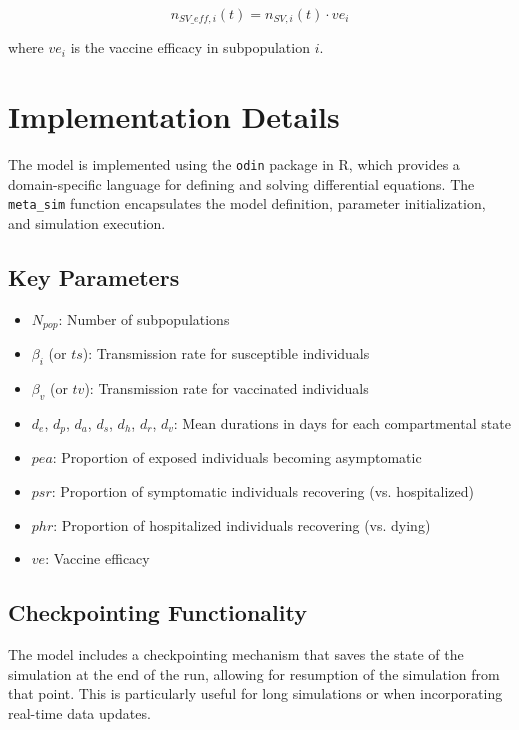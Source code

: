 \documentclass{article}
\begin{document}
\begin{equation}
n_{SV\_eff,i}(t) = n_{SV,i}(t) \cdot ve_i
\end{equation}

where $ve_i$ is the vaccine efficacy in subpopulation $i$.

\section{Implementation Details}

The model is implemented using the \texttt{odin} package in R, which provides a domain-specific language for defining and solving differential equations. The \texttt{meta\_sim} function encapsulates the model definition, parameter initialization, and simulation execution.

\subsection{Key Parameters}

\begin{itemize}
    \item $N_{pop}$: Number of subpopulations
    \item $\beta_i$ (or $ts$): Transmission rate for susceptible individuals
    \item $\beta_v$ (or $tv$): Transmission rate for vaccinated individuals
    \item $d_e$, $d_p$, $d_a$, $d_s$, $d_h$, $d_r$, $d_v$: Mean durations in days for each compartmental state
    \item $pea$: Proportion of exposed individuals becoming asymptomatic
    \item $psr$: Proportion of symptomatic individuals recovering (vs. hospitalized)
    \item $phr$: Proportion of hospitalized individuals recovering (vs. dying)
    \item $ve$: Vaccine efficacy
\end{itemize}

\subsection{Checkpointing Functionality}

The model includes a checkpointing mechanism that saves the state of the simulation at the end of the run, allowing for resumption of the simulation from that point. This is particularly useful for long simulations or when incorporating real-time data updates.
\end{document}
